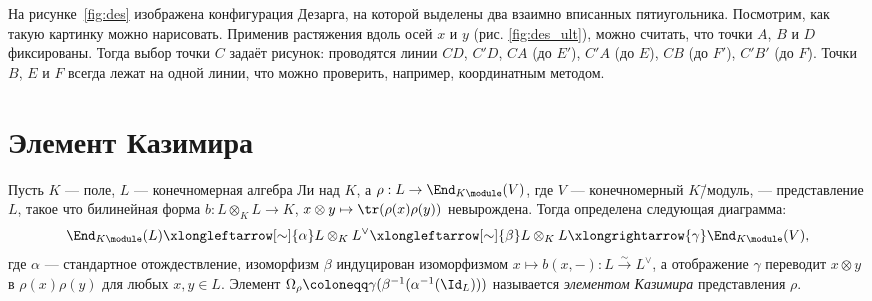 \documentclass[
	extrafontsizes,
	11pt,
	hyphens,
]{memoir}
\begin{document}
\noindent
На
рисунке~\ref{fig:des} изображена конфигурация Дезарга, на которой выделены два взаимно вписанных пятиугольника. Посмотрим, как такую картинку можно нарисовать.
Применив растяжения вдоль осей \(x\) и \(y\) (рис. \ref{fig:des_ult}), можно считать, что точки \(A\), \(B\) и \(D\) фиксированы. Тогда выбор точки \(C\) задаёт рисунок: проводятся линии \(CD\), \(C'D\), \(CA\) (до \(E'\)), \(C'A\) (до \(E\)), \(CB\) (до \(F'\)), \(C'B'\) (до \(F\)). Точки \(B\), \(E\) и \(F\) всегда лежат на одной линии, что можно проверить, например, координатным методом.


\section{Элемент Казимира}

%

\begin{definition}
Пусть \(K\) --- поле, \(L\) --- конечномерная алгебра Ли над \(K\), а \(\rho : L \to \End_{K\module}(V)\), где \(V\) --- конечномерный \(K\)\=/модуль, --- представление \(L\), такое что билинейная форма
\(b : L \otimes_K L \to K\), \(x \otimes y \mapsto \tr(\rho(x)\rho(y))\)
невырождена.%
\label{def:CasimirElementRep}
Тогда определена следующая диаграмма:
\begin{equation}
\End_{K\module}(L)
\xlongleftarrow[\sim]{\alpha}
L \otimes_K L^{\vee}
\xlongleftarrow[\sim]{\beta}
L \otimes_K L
\xlongrightarrow{\gamma}
\End_{K\module}(V),%
\label{eq:CasimirElementDef}
\end{equation}
где \(\alpha\) --- стандартное отождествление,
изоморфизм \(\beta\) индуцирован изоморфизмом \(x \mapsto b(x,-) : L \xrightarrow{\sim} L^{\vee}\),
а отображение \(\gamma\) переводит \(x \otimes y\) в \(\rho(x)\rho(y)\) для любых \(x, y \in L\).
Элемент \(\Omega_{\rho} \coloneqq \gamma(\beta^{-1}(\alpha^{-1}(\Id_L)))\) называется \emph{элементом Казимира} представления \(\rho\).
\end{definition}
\end{document}
